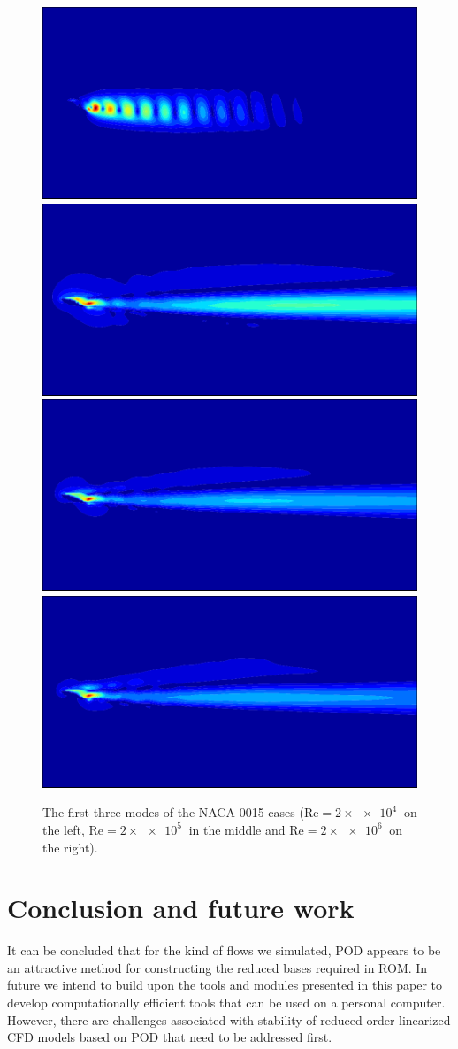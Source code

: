 \documentclass[3p,times,procedia]{elsarticle}
\begin{document}
\begin{figure}
\begin{center}
    \includegraphics[width=0.31\linewidth]{figs/Re6mode03} \\
    \includegraphics[width=0.31\linewidth]{figs/Re4mode04}
    \includegraphics[width=0.31\linewidth]{figs/Re5mode04}
    \includegraphics[width=0.31\linewidth]{figs/Re6mode04} \\
  \end{center}
  \caption{
    The first three modes of the NACA 0015 cases ($\text{Re} = 2\times
    \SI{e4}{}$ on the left,  $\text{Re} = 2\times \SI{e5}{}$ in the middle and
    $\text{Re} = 2\times \SI{e6}{}$ on the right).
  }
  \label{fig:nacamodes}
\end{figure}

\section{Conclusion and future work}

It can be concluded that for the kind of flows we simulated, POD appears to be
an attractive method for constructing the reduced bases required in ROM. In
future we intend to build upon the tools and modules presented in this paper to
develop computationally efficient tools that can be used on a personal computer.
However, there are challenges associated with stability of reduced-order
linearized CFD models based on POD \cite[Chapter 8]{Quarteroni2014rom} that need
to be addressed first.
\end{document}
